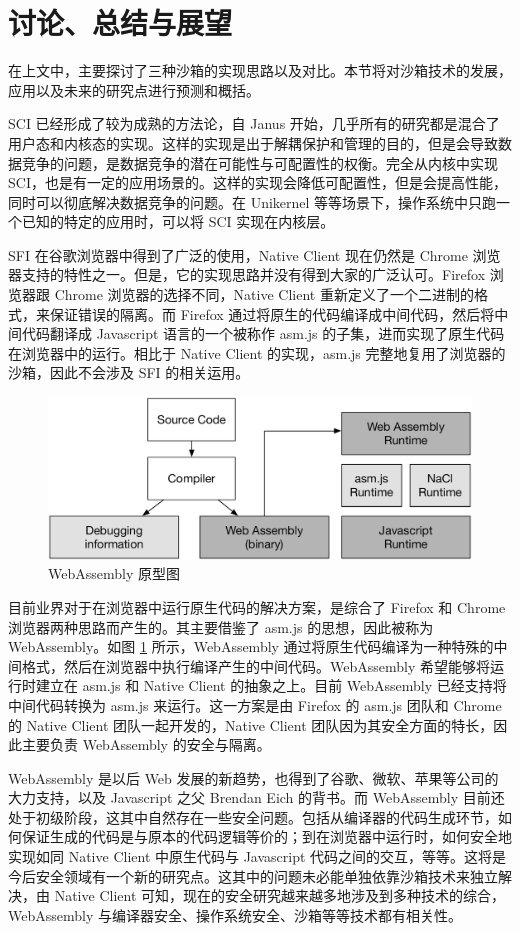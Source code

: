 \documentclass[final,5p,times]{elsarticle}
\begin{document}
\section{讨论、总结与展望}
\label{s:tucao}

在上文中，主要探讨了三种沙箱的实现思路以及对比。本节将对沙箱技术的发展，应用以及未来的研究点进行预测和概括。

SCI 已经形成了较为成熟的方法论，自 Janus 开始，几乎所有的研究都是混合了用户态和内核态的实现。这样的实现是出于解耦保护和管理的目的，但是会导致数据竞争的问题，是数据竞争的潜在可能性与可配置性的权衡。完全从内核中实现 SCI，也是有一定的应用场景的。这样的实现会降低可配置性，但是会提高性能，同时可以彻底解决数据竞争的问题。在 Unikernel 等等场景下，操作系统中只跑一个已知的特定的应用时，可以将 SCI 实现在内核层。

SFI 在谷歌浏览器中得到了广泛的使用，Native Client 现在仍然是 Chrome 浏览器支持的特性之一。但是，它的实现思路并没有得到大家的广泛认可。Firefox 浏览器跟 Chrome 浏览器的选择不同，Native Client 重新定义了一个二进制的格式，来保证错误的隔离。而 Firefox 通过将原生的代码编译成中间代码，然后将中间代码翻译成 Javascript 语言的一个被称作 asm.js 的子集，进而实现了原生代码在浏览器中的运行。相比于 Native Client 的实现，asm.js 完整地复用了浏览器的沙箱，因此不会涉及 SFI 的相关运用。

\begin{figure}
\centering
\includegraphics[width=0.7\linewidth]{imgs/wasm}
\caption{WebAssembly 原型图}
\label{fig:wasm}
\end{figure}

目前业界对于在浏览器中运行原生代码的解决方案，是综合了 Firefox 和 Chrome 浏览器两种思路而产生的。其主要借鉴了 asm.js 的思想，因此被称为 WebAssembly。如图 \ref{fig:wasm} 所示，WebAssembly 通过将原生代码编译为一种特殊的中间格式，然后在浏览器中执行编译产生的中间代码。WebAssembly 希望能够将运行时建立在 asm.js 和 Native Client 的抽象之上。目前 WebAssembly 已经支持将中间代码转换为 asm.js 来运行。这一方案是由 Firefox 的 asm.js 团队和 Chrome 的 Native Client 团队一起开发的，Native Client 团队因为其安全方面的特长，因此主要负责 WebAssembly 的安全与隔离。

WebAssembly 是以后 Web 发展的新趋势，也得到了谷歌、微软、苹果等公司的大力支持，以及 Javascript 之父 Brendan Eich 的背书。而 WebAssembly 目前还处于初级阶段，这其中自然存在一些安全问题。包括从编译器的代码生成环节，如何保证生成的代码是与原本的代码逻辑等价的；到在浏览器中运行时，如何安全地实现如同 Native Client 中原生代码与 Javascript 代码之间的交互，等等。这将是今后安全领域有一个新的研究点。这其中的问题未必能单独依靠沙箱技术来独立解决，由 Native Client 可知，现在的安全研究越来越多地涉及到多种技术的综合，WebAssembly 与编译器安全、操作系统安全、沙箱等等技术都有相关性。
\end{document}

